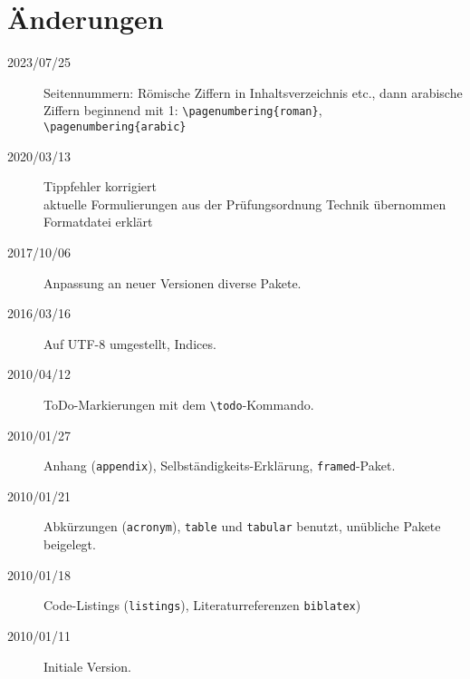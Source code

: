 
\chapter*{Änderungen}

\begin{description}
\item[2023/07/25] Seitennummern: Römische Ziffern in Inhaltsverzeichnis etc., dann arabische Ziffern
                  beginnend mit 1: \verb+\pagenumbering{roman}+,
                  \verb+\pagenumbering{arabic}+
\item[2020/03/13] Tippfehler korrigiert\\
                  aktuelle Formulierungen aus der Prüfungsordnung Technik übernommen\\
                  Formatdatei erklärt
\item[2017/10/06] Anpassung an neuer Versionen diverse Pakete.
\item[2016/03/16] Auf UTF-8 umgestellt, Indices.
\item[2010/04/12] ToDo-Markierungen mit dem \verb+\todo+-Kommando.
\item[2010/01/27] Anhang (\texttt{appendix}), Selbständigkeits-Erklärung, \texttt{framed}-Paket.
\item[2010/01/21] Abkürzungen (\texttt{acronym}), \texttt{table} und \texttt{tabular} benutzt,
     unübliche Pakete beigelegt.
\item[2010/01/18] Code-Listings (\texttt{listings}), Literaturreferenzen \texttt{biblatex})
\item[2010/01/11] Initiale Version.
\end{description}
